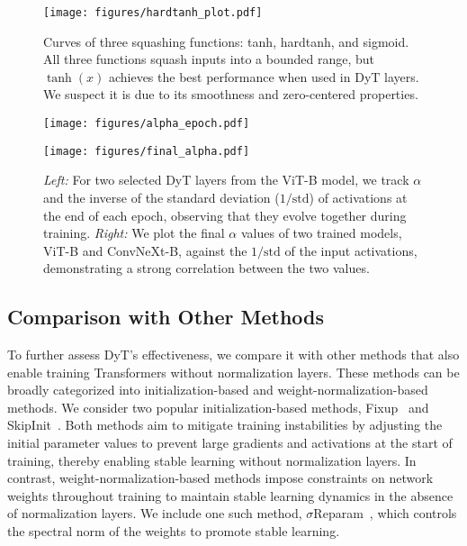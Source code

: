 \documentclass[]{fairmeta}
\begin{document}
\begin{figure}[t]
\vspace{-0.3in}
\centering
\begin{minipage}{0.39\textwidth}
\centering
\vspace{0.05cm}
\texttt{[image: figures/hardtanh\_plot.pdf]}
\vspace{0.3cm}
\caption{Curves of three squashing functions: tanh, hardtanh, and sigmoid. All three functions squash inputs into a bounded range, but $\tanh(x)$ achieves the best performance when used in DyT layers. We suspect it is due to its smoothness and zero-centered properties.}

\label{figure:hardtanh}
\end{minipage}
\hfill
\begin{minipage}{0.58\textwidth}
\centering
\begin{minipage}{0.48\textwidth}
\texttt{[image: figures/alpha\_epoch.pdf]}
\end{minipage}
\hfill
\begin{minipage}{0.48\textwidth}
\texttt{[image: figures/final\_alpha.pdf]}
\end{minipage}
\caption{\emph{Left:} For two selected DyT layers from the ViT-B model, we track $\alpha$ and the inverse of the standard deviation ($1/\mathrm{std}$) of activations at the end of each epoch, observing that they evolve together during training. \emph{Right:} We plot the final $\alpha$ values of two trained models, ViT-B and ConvNeXt-B, against the $1/\mathrm{std}$ of the input activations, demonstrating a strong correlation between the two values.}
\label{figure:all_three}
\end{minipage}
\end{figure}

\subsection{Comparison with Other Methods}


To further assess DyT's effectiveness, we compare it with other methods that also enable training Transformers without normalization layers. These methods can be broadly categorized into initialization-based and weight-normalization-based methods.
We consider two popular initialization-based methods, Fixup~\citep{zhang2019fixup, huang2020improving} and SkipInit~\citep{de2020batch, bachlechner2021rezero}.
Both methods aim to mitigate training instabilities by adjusting the initial parameter values to prevent large gradients and activations at the start of training, thereby enabling stable learning without normalization layers.
In contrast, weight-normalization-based methods impose constraints on network weights throughout training to maintain stable learning dynamics in the absence of normalization layers. We include one such method, $\sigma$Reparam~\citep{zhai2023stabilizing}, which controls the spectral norm of the weights to promote stable learning.
\end{document}

